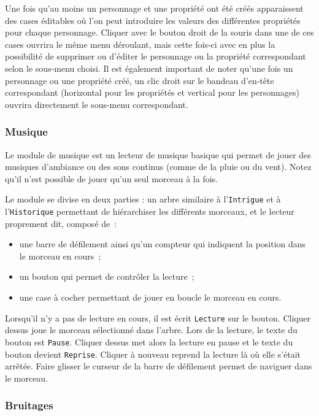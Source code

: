 \documentclass[a4paper,12pt]{article}
\newcommand*{\interfaceitem}[1]{\texttt{#1}}
\begin{document}
Une fois qu'au moins un personnage et une propriété ont été créés apparaissent des cases éditables où l'on peut introduire les valeurs des différentes propriétés pour chaque personnage.
Cliquer avec le bouton droit de la souris dans une de ces cases ouvrira le même menu déroulant, mais cette fois-ci avec en plus la possibilité de supprimer ou d'éditer le personnage ou la propriété correspondant selon le sous-menu choisi.
Il est également important de noter qu'une fois un personnage ou une propriété créé, un clic droit sur le bandeau d'en-tête correspondant (horizontal pour les propriétés et vertical pour les personnages) ouvrira directement le sous-menu correspondant.

\subsubsection{Musique}
\label{sec:musique}

Le module de musique est un lecteur de musique basique qui permet de jouer des musiques d'ambiance ou des sons continus (comme de la pluie ou du vent).
Notez qu'il n'est possible de jouer qu'un seul morceau à la fois.

Le module se divise en deux parties : un arbre similaire à l'\interfaceitem{Intrigue} et à l'\interfaceitem{Historique} permettant de hiérarchiser les différents morceaux, et le lecteur proprement dit, composé de~:
\begin{itemize}
    \item une barre de défilement ainsi qu'un compteur qui indiquent la position dans le morceau en cours~;
    \item un bouton qui permet de contrôler la lecture~;
    \item une case à cocher permettant de jouer en boucle le morceau en cours.
\end{itemize}
Lorsqu'il n'y a pas de lecture en cours, il est écrit \interfaceitem{Lecture} sur le bouton.
Cliquer dessus joue le morceau sélectionné dans l'arbre.
Lors de la lecture, le texte du bouton est \interfaceitem{Pause}.
Cliquer dessus met alors la lecture en pause et le texte du bouton devient \interfaceitem{Reprise}.
Cliquer à nouveau reprend la lecture là où elle s'était arrêtée.
Faire glisser le curseur de la barre de défilement permet de naviguer dans le morceau.

\subsubsection{Bruitages}
\label{sec:bruitages}
\end{document}
